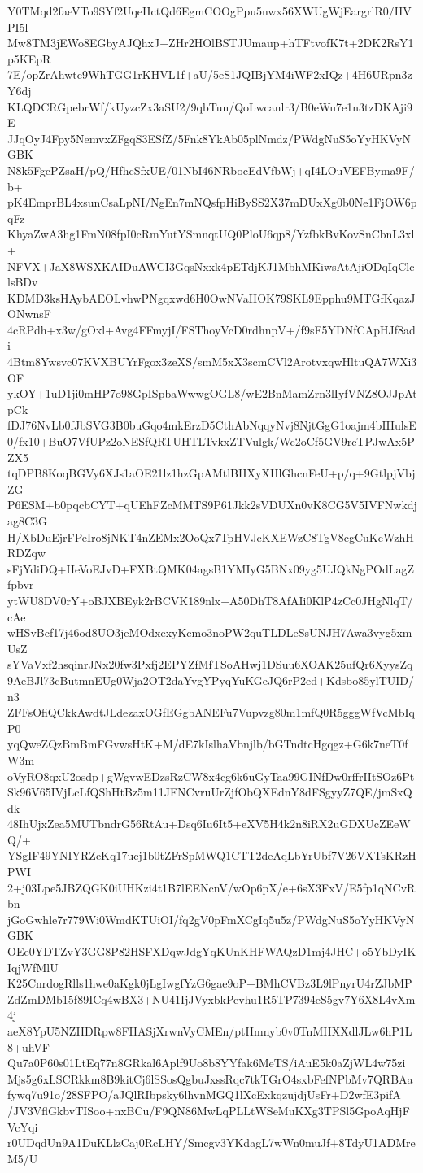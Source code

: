 Y0TMqd2faeVTo9SYf2UqeHctQd6EgmCOOgPpu5nwx56XWUgWjEargrlR0/HVPI5l
Mw8TM3jEWo8EGbyAJQhxJ+ZHr2HOlBSTJUmaup+hTFtvofK7t+2DK2RsY1p5KEpR
7E/opZrAhwtc9WhTGG1rKHVL1f+aU/5eS1JQIBjYM4iWF2xIQz+4H6URpn3zY6dj
KLQDCRGpebrWf/kUyzcZx3aSU2/9qbTun/QoLwcanlr3/B0eWu7e1n3tzDKAji9E
JJqOyJ4Fpy5NemvxZFgqS3ESfZ/5Fnk8YkAb05plNmdz/PWdgNuS5oYyHKVyNGBK
N8k5FgcPZsaH/pQ/HfhcSfxUE/01NbI46NRbocEdVfbWj+qI4LOuVEFByma9F/b+
pK4EmprBL4xsunCsaLpNI/NgEn7mNQsfpHiBySS2X37mDUxXg0b0Ne1FjOW6pqFz
KhyaZwA3hg1FmN08fpI0cRmYutYSmnqtUQ0PloU6qp8/YzfbkBvKovSnCbnL3xl+
NFVX+JaX8WSXKAIDuAWCI3GqsNxxk4pETdjKJ1MbhMKiwsAtAjiODqIqClclsBDv
KDMD3ksHAybAEOLvhwPNgqxwd6H0OwNVaIIOK79SKL9Epphu9MTGfKqazJONwnsF
4cRPdh+x3w/gOxl+Avg4FFmyjI/FSThoyVcD0rdhnpV+/f9sF5YDNfCApHJf8adi
4Btm8Ywsvc07KVXBUYrFgox3zeXS/smM5xX3scmCVl2ArotvxqwHltuQA7WXi3OF
ykOY+1uD1ji0mHP7o98GpISpbaWwwgOGL8/wE2BnMamZrn3lIyfVNZ8OJJpAtpCk
fDJ76NvLb0fJbSVG3B0buGqo4mkErzD5CthAbNqqyNvj8NjtGgG1oajm4bIHulsE
0/fx10+BuO7VfUPz2oNESfQRTUHTLTvkxZTVulgk/Wc2oCf5GV9rcTPJwAx5PZX5
tqDPB8KoqBGVy6XJs1aOE21lz1hzGpAMtlBHXyXHlGhcnFeU+p/q+9GtlpjVbjZG
P6ESM+b0pqcbCYT+qUEhFZcMMTS9P61Jkk2sVDUXn0vK8CG5V5IVFNwkdjag8C3G
H/XbDuEjrFPeIro8jNKT4nZEMx2OoQx7TpHVJcKXEWzC8TgV8cgCuKcWzhHRDZqw
sFjYdiDQ+HeVoEJvD+FXBtQMK04agsB1YMIyG5BNx09yg5UJQkNgPOdLagZfpbvr
ytWU8DV0rY+oBJXBEyk2rBCVK189nlx+A50DhT8AfAIi0KlP4zCc0JHgNlqT/cAe
wHSvBcf17j46od8UO3jeMOdxexyKcmo3noPW2quTLDLeSsUNJH7Awa3vyg5xmUsZ
sYVaVxf2hsqinrJNx20fw3Pxfj2EPYZfMfTSoAHwj1DSuu6XOAK25ufQr6XyysZq
9AeBJl73cButmnEUg0Wja2OT2daYvgYPyqYuKGeJQ6rP2ed+Kdsbo85ylTUID/n3
ZFFsOfiQCkkAwdtJLdezaxOGfEGgbANEFu7Vupvzg80m1mfQ0R5gggWfVcMbIqP0
yqQweZQzBmBmFGvwsHtK+M/dE7kIslhaVbnjlb/bGTndtcHgqgz+G6k7neT0fW3m
oVyRO8qxU2osdp+gWgvwEDzsRzCW8x4cg6k6uGyTaa99GINfDw0rffrIItSOz6Pt
Sk96V65IVjLcLfQShHtBz5m11JFNCvruUrZjfObQXEdnY8dFSgyyZ7QE/jmSxQdk
48IhUjxZea5MUTbndrG56RtAu+Dsq6Iu6It5+eXV5H4k2n8iRX2uGDXUcZEeWQ/+
YSgIF49YNIYRZeKq17ucj1b0tZFrSpMWQ1CTT2deAqLbYrUbf7V26VXTsKRzHPWI
2+j03Lpe5JBZQGK0iUHKzi4t1B7lEENcnV/wOp6pX/e+6sX3FxV/E5fp1qNCvRbn
jGoGwhle7r779Wi0WmdKTUiOI/fq2gV0pFmXCgIq5u5z/PWdgNuS5oYyHKVyNGBK
OEe0YDTZvY3GG8P82HSFXDqwJdgYqKUnKHFWAQzD1mj4JHC+o5YbDyIKIqjWfMlU
K25CnrdogRlls1hwe0aKgk0jLgIwgfYzG6gae9oP+BMhCVBz3L9lPnyrU4rZJbMP
ZdZmDMb15f89ICq4wBX3+NU41IjJVyxbkPevhu1R5TP7394eS5gv7Y6X8L4vXm4j
aeX8YpU5NZHDRpw8FHASjXrwnVyCMEn/ptHmnyb0v0TnMHXXdlJLw6hP1L8+uhVF
Qu7a0P60s01LtEq77n8GRkal6Aplf9Uo8b8YYfak6MeTS/iAuE5k0aZjWL4w75zi
Mjs5g6xLSCRkkm8B9kitCj6lSSosQgbuJxssRqc7tkTGrO4sxbFefNPbMv7QRBAa
fywq7u91o/28SFPO/aJQlRIbpsky6lhvnMGQ1lXcExkqzujdjUsFr+D2wfE3pifA
/JV3VflGkbvTISoo+nxBCu/F9QN86MwLqPLLtWSeMuKXg3TPSl5GpoAqHjFVcYqi
r0UDqdUn9A1DuKLlzCaj0RcLHY/Smcgv3YKdagL7wWn0muJf+8TdyU1ADMreM5/U
